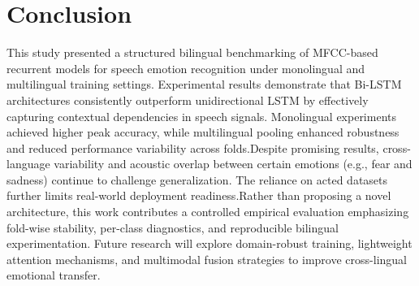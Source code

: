 \documentclass[runningheads]{llncs}
\begin{document}



\section{Conclusion}
This study presented a structured bilingual benchmarking of MFCC-based recurrent models for speech emotion recognition under monolingual and multilingual training settings. Experimental results demonstrate that Bi-LSTM architectures consistently outperform unidirectional LSTM by effectively capturing contextual dependencies in speech signals. Monolingual experiments achieved higher peak accuracy, while multilingual pooling enhanced robustness and reduced performance variability across folds.Despite promising results, cross-language variability and acoustic overlap between certain emotions (e.g., fear and sadness) continue to challenge generalization. The reliance on acted datasets further limits real-world deployment readiness.Rather than proposing a novel architecture, this work contributes a controlled empirical evaluation emphasizing fold-wise stability, per-class diagnostics, and reproducible bilingual experimentation. Future research will explore domain-robust training, lightweight attention mechanisms, and multimodal fusion strategies to improve cross-lingual emotional transfer.
\clearpage

\end{document}
